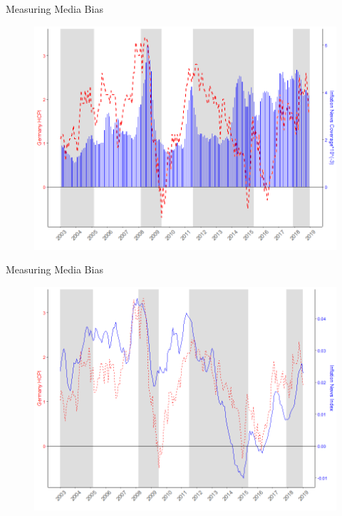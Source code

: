 \documentclass[aspectratio=169,xcolor=dvipsnames]{beamer}
\begin{document}

\begin{frame}{Measuring Media Bias}

 \begin{figure}[!ht]
    \centering
    \includegraphics{Inflation_Count.png}
    \end{figure}

\end{frame}


\begin{frame}{Measuring Media Bias}

 \begin{figure}[!ht]
    \centering
    \includegraphics{Inflation_Sentiment_Direction.png}
    \label{Inflation_Sentiment_Direction}
    \end{figure}

\end{frame}
\end{document}
